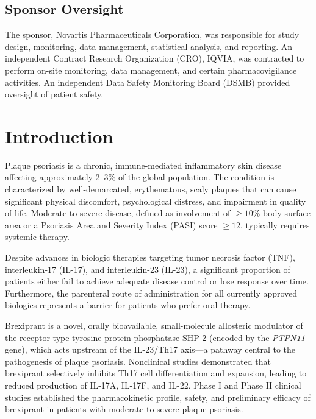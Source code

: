 \documentclass[11pt, a4paper]{article}
\begin{document}
\subsection{Sponsor Oversight}

The sponsor, Novartis Pharmaceuticals Corporation, was responsible for study design, monitoring, data management, statistical analysis, and reporting. An independent Contract Research Organization (CRO), IQVIA, was contracted to perform on-site monitoring, data management, and certain pharmacovigilance activities. An independent Data Safety Monitoring Board (DSMB) provided oversight of patient safety.

\newpage

\section{Introduction}

Plaque psoriasis is a chronic, immune-mediated inflammatory skin disease affecting approximately 2--3\% of the global population. The condition is characterized by well-demarcated, erythematous, scaly plaques that can cause significant physical discomfort, psychological distress, and impairment in quality of life. Moderate-to-severe disease, defined as involvement of $\ge 10\%$ body surface area or a Psoriasis Area and Severity Index (PASI) score $\ge 12$, typically requires systemic therapy.

\vspace{4pt}
Despite advances in biologic therapies targeting tumor necrosis factor (TNF), interleukin-17 (IL-17), and interleukin-23 (IL-23), a significant proportion of patients either fail to achieve adequate disease control or lose response over time. Furthermore, the parenteral route of administration for all currently approved biologics represents a barrier for patients who prefer oral therapy.

\vspace{4pt}
Brexiprant is a novel, orally bioavailable, small-molecule allosteric modulator of the receptor-type tyrosine-protein phosphatase SHP-2 (encoded by the \textit{PTPN11} gene), which acts upstream of the IL-23/Th17 axis---a pathway central to the pathogenesis of plaque psoriasis. Nonclinical studies demonstrated that brexiprant selectively inhibits Th17 cell differentiation and expansion, leading to reduced production of IL-17A, IL-17F, and IL-22. Phase I and Phase II clinical studies established the pharmacokinetic profile, safety, and preliminary efficacy of brexiprant in patients with moderate-to-severe plaque psoriasis.
\end{document}
